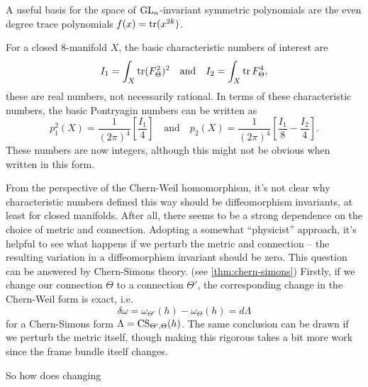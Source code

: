 \begin{note*}
	A useful basis for the space of ${\operatorname{GL}}_n$-invariant symmetric polynomials are the even degree trace polynomials $f(x)=\operatorname{\operatorname{tr}}(x^{2k})$.
\end{note*}

\begin{example}\label{exam:chern-weil_8-manifold}
	For a closed $8$-manifold $X$, the basic characteristic numbers of interest are
	\[
		I_1 = \int_X \operatorname{\operatorname{tr}} (F_\Theta^2)^2
		\quad\textrm{and}\quad
		I_2 = \int_X \operatorname{\operatorname{tr}} F_\Theta^4,
	\]
	these are real numbers, not necessarily rational. In terms of these characteristic numbers, the basic Pontryagin numbers can be written as
	\[
		p_1^2(X) = \frac{1}{(2\pi)^4} \left[\frac{I_1}{4}\right]
		\quad\textrm{and}\quad
		p_2(X) = \frac{1}{(2\pi)^4}\left[\frac{I_1}{8} - \frac{I_2}{4}\right].
	\]
	These numbers are now integers, although this might not be obvious when written in this form.
\end{example}

From the perspective of the Chern-Weil homomorphism, it's not clear why
characteristic numbers defined this way should be diffeomorphism invariants, at least for closed manifolds. After all, there seems to be a strong dependence on the choice of metric and connection.
Adopting a somewhat ``physicist'' approach, it's helpful to see what happens if we perturb the metric and connection -- the resulting variation in a diffeomorphism invariant should be zero.
This question can be answered by Chern-Simons theory. (see \cref{thm:chern-simons}) Firstly, if we change our connection $\Theta$ to a connection $\Theta'$, the corresponding change in the Chern-Weil form is exact, i.e.
\[
	\delta \omega = \omega_{\Theta'}(h) - \omega_{\Theta}(h) = d\Lambda
\]
for a Chern-Simons form $\Lambda = {\operatorname{CS}}_{\Theta',\Theta}(h)$. The same conclusion can be drawn if we perturb the metric itself, though making this rigorous takes a bit more work since the frame bundle itself changes.
\begin{remark}
\end{remark}
So how does changing



